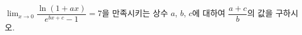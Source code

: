 $\displaystyle\lim_{x\to 0}\dfrac{\ln(1+ax)}{e^{bx+c}-1}=7$을 만족시키는 상수 $a$, $b$, $c$에 대하여 $\dfrac{a+c}{b}$의 값을 구하시오.
